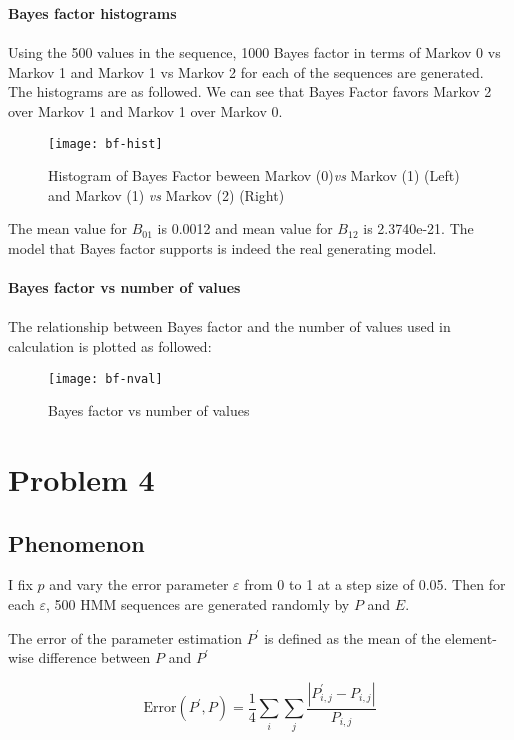 \documentclass[paper=a4, fontsize=11pt]{scrartcl} %
\numberwithin{equation}{section} %
\numberwithin{figure}{section} %
\numberwithin{table}{section} %
\begin{document}
{\bf Bayes factor histograms}
\\\\
Using the 500 values in the sequence, 1000 Bayes factor in terms of Markov 0 vs Markov 1 and Markov 1 vs Markov 2 for each of the sequences are generated. The histograms are as followed. We can see that Bayes Factor favors Markov 2 over Markov 1 and Markov 1 over Markov 0.
 
\begin{figure}[H]
  \centering
  \texttt{[image: bf-hist]}
  \caption{Histogram of Bayes Factor beween Markov (0){\em vs} Markov (1) (Left) and Markov (1) {\em vs} Markov (2) (Right)}
\end{figure}

The mean value for $B_{01}$ is 0.0012 and mean value for $B_{12}$ is 2.3740e-21. The model that Bayes factor supports is indeed the real generating model.
\\\\
{\bf Bayes factor vs number of values}
\\\\
The relationship between Bayes factor and the number of values used in calculation is plotted as followed:

\begin{figure}[H]
  \centering
  \texttt{[image: bf-nval]}
  \caption{Bayes factor vs number of values}
\end{figure}


\section{Problem 4}
\subsection {Phenomenon}
I fix $p$ and vary the error parameter $\varepsilon$ from 0 to 1 at a step size of 0.05. Then for each $\varepsilon$, 500 HMM sequences are generated randomly by $P$ and $E$.

The error of the parameter estimation $P^{'}$ is defined as the mean of the element-wise difference between $P$ and $P^{'}$ 

\[ \mathrm{Error} (P^{'}, P) = \frac {1} {4} \sum_{i} \sum_{j} \frac{|P^{'}_{i,j} - P_{i,j}|}{P_{i,j}} \]
\end{document}
